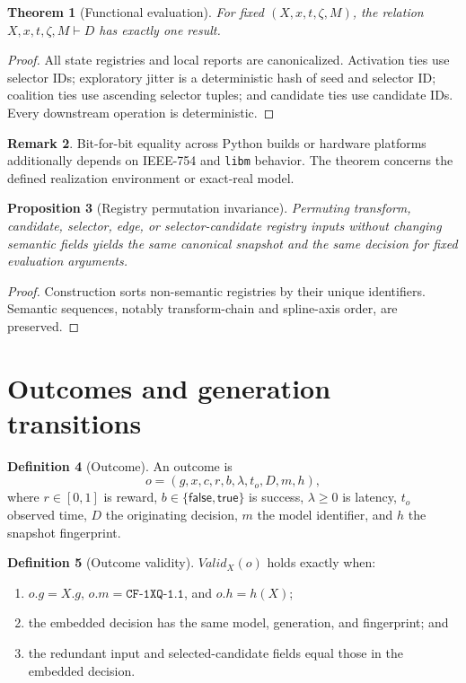 \documentclass[11pt]{article}
\theoremstyle{definition}
\newtheorem{definition}{Definition}[section]
\newtheorem{remark}[definition]{Remark}
\theoremstyle{plain}
\newtheorem{theorem}[definition]{Theorem}
\newtheorem{proposition}[definition]{Proposition}
\newcommand{\modelid}{\texttt{CF-1XQ-1.1}}
\begin{document}
\begin{theorem}[Functional evaluation]
\label{thm:determinism}
For fixed $(X,x,t,\zeta,M)$, the relation
$X,x,t,\zeta,M\vdash D$ has exactly one result.
\end{theorem}

\begin{proof}
All state registries and local reports are canonicalized.  Activation ties use
selector IDs; exploratory jitter is a deterministic hash of seed and selector
ID; coalition ties use ascending selector tuples; and candidate ties use
candidate IDs.  Every downstream operation is deterministic.
\end{proof}

\begin{remark}
Bit-for-bit equality across Python builds or hardware platforms additionally
depends on IEEE-754 and \texttt{libm} behavior.  The theorem concerns the
defined realization environment or exact-real model.
\end{remark}

\begin{proposition}[Registry permutation invariance]
Permuting transform, candidate, selector, edge, or selector-candidate registry
inputs without changing semantic fields yields the same canonical snapshot and
the same decision for fixed evaluation arguments.
\end{proposition}

\begin{proof}
Construction sorts non-semantic registries by their unique identifiers.
Semantic sequences, notably transform-chain and spline-axis order, are
preserved.
\end{proof}

\section{Outcomes and generation transitions}

\begin{definition}[Outcome]
An outcome is
\[
o=(g,x,c,r,b,\lambda,t_o,D,m,h),
\]
where $r\in[0,1]$ is reward, $b\in\{\mathsf{false},\mathsf{true}\}$ is success,
$\lambda\ge0$ is latency, $t_o$ observed time, $D$ the originating decision,
$m$ the model identifier, and $h$ the snapshot fingerprint.
\end{definition}

\begin{definition}[Outcome validity]
$Valid_X(o)$ holds exactly when:
\begin{enumerate}[leftmargin=*,itemsep=1pt]
  \item $o.g=X.g$, $o.m=\modelid$, and $o.h=h(X)$;
  \item the embedded decision has the same model, generation, and fingerprint;
  and
  \item the redundant input and selected-candidate fields equal those in the
  embedded decision.
\end{enumerate}
\end{definition}
\end{document}
